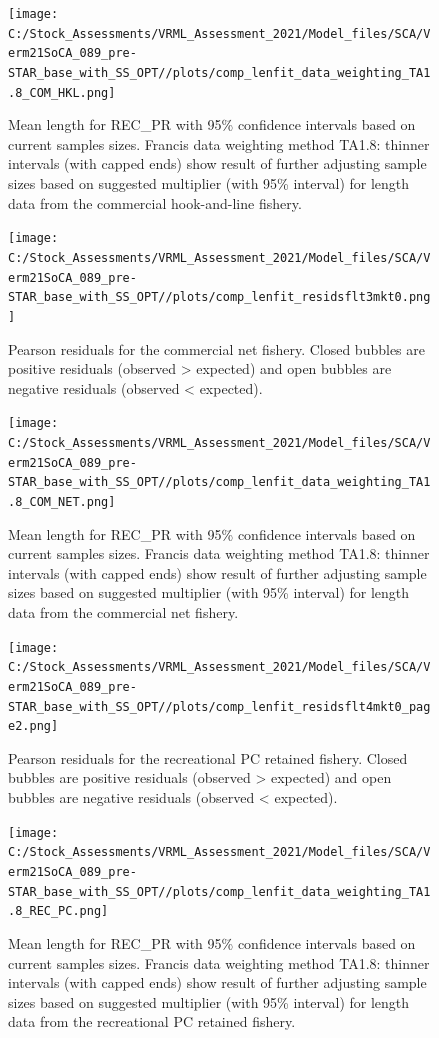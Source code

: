 \documentclass[11pt,
  english,
  a4paper,
]{article}
\begin{document}
\begin{figure}
\centering
\texttt{[image: C:/Stock\_Assessments/VRML\_Assessment\_2021/Model\_files/SCA/Verm21SoCA\_089\_pre-STAR\_base\_with\_SS\_OPT//plots/comp\_lenfit\_data\_weighting\_TA1.8\_COM\_HKL.png]}
\caption{Mean length for REC\_PR with 95\% confidence intervals based on current samples sizes. Francis data weighting method TA1.8: thinner intervals (with capped ends) show result of further adjusting sample sizes based on suggested multiplier (with 95\% interval) for length data from the commercial hook-and-line fishery.\label{fig:mean-len-fit-COM-HKL}}
\end{figure}

\begin{figure}
\centering
\texttt{[image: C:/Stock\_Assessments/VRML\_Assessment\_2021/Model\_files/SCA/Verm21SoCA\_089\_pre-STAR\_base\_with\_SS\_OPT//plots/comp\_lenfit\_residsflt3mkt0.png]}
\caption{Pearson residuals for the commercial net fishery. Closed bubbles are positive residuals (observed \textgreater{} expected) and open bubbles are negative residuals (observed \textless{} expected).\label{fig:len-pearson-COM-NET}}
\end{figure}

\begin{figure}
\centering
\texttt{[image: C:/Stock\_Assessments/VRML\_Assessment\_2021/Model\_files/SCA/Verm21SoCA\_089\_pre-STAR\_base\_with\_SS\_OPT//plots/comp\_lenfit\_data\_weighting\_TA1.8\_COM\_NET.png]}
\caption{Mean length for REC\_PR with 95\% confidence intervals based on current samples sizes. Francis data weighting method TA1.8: thinner intervals (with capped ends) show result of further adjusting sample sizes based on suggested multiplier (with 95\% interval) for length data from the commercial net fishery.\label{fig:mean-len-fit-COM-NET}}
\end{figure}

\begin{figure}
\centering
\texttt{[image: C:/Stock\_Assessments/VRML\_Assessment\_2021/Model\_files/SCA/Verm21SoCA\_089\_pre-STAR\_base\_with\_SS\_OPT//plots/comp\_lenfit\_residsflt4mkt0\_page2.png]}
\caption{Pearson residuals for the recreational PC retained fishery. Closed bubbles are positive residuals (observed \textgreater{} expected) and open bubbles are negative residuals (observed \textless{} expected).\label{fig:len-pearson-REC-PC}}
\end{figure}

\begin{figure}
\centering
\texttt{[image: C:/Stock\_Assessments/VRML\_Assessment\_2021/Model\_files/SCA/Verm21SoCA\_089\_pre-STAR\_base\_with\_SS\_OPT//plots/comp\_lenfit\_data\_weighting\_TA1.8\_REC\_PC.png]}
\caption{Mean length for REC\_PR with 95\% confidence intervals based on current samples sizes. Francis data weighting method TA1.8: thinner intervals (with capped ends) show result of further adjusting sample sizes based on suggested multiplier (with 95\% interval) for length data from the recreational PC retained fishery.\label{fig:mean-len-fit-REC-PC}}
\end{figure}
\end{document}
